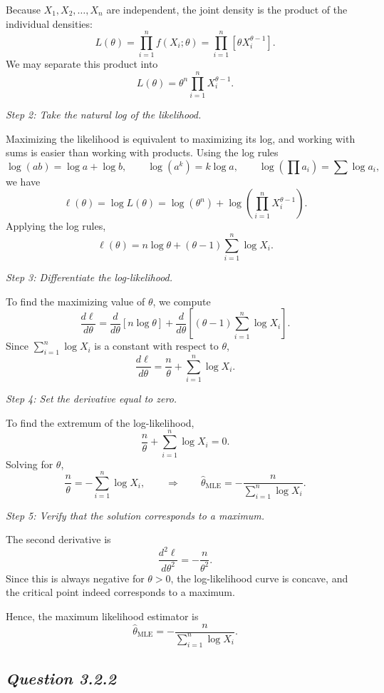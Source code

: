 \documentclass[11pt,letterpaper]{article}
\theoremstyle{remark}
\begin{document}
Because $X_1, X_2, \dots, X_n$ are independent, the joint density is the
product of the individual densities:
\[
L(\theta)
= \prod_{i=1}^n f(X_i;\theta)
= \prod_{i=1}^n \left[\theta X_i^{\theta-1}\right].
\]
We may separate this product into
\[
L(\theta)
= \theta^n \prod_{i=1}^n X_i^{\theta-1}.
\]

\textit{Step 2: Take the natural log of the likelihood.}

Maximizing the likelihood is equivalent to maximizing its log,
and working with sums is easier than working with products.
Using the log rules
\[
\log(a b) = \log a + \log b, \qquad
\log(a^k) = k \log a, \qquad
\log\left(\prod a_i\right) = \sum \log a_i,
\]
we have
\[
\ell(\theta)
= \log L(\theta)
= \log(\theta^n) + \log\left(\prod_{i=1}^n X_i^{\theta-1}\right).
\]
Applying the log rules,
\[
\ell(\theta)
= n\log\theta + (\theta - 1)\sum_{i=1}^n \log X_i.
\]

\textit{Step 3: Differentiate the log-likelihood.}

To find the maximizing value of $\theta$, we compute
\[
\frac{d\ell}{d\theta}
= \frac{d}{d\theta}\left[n\log\theta\right]
+ \frac{d}{d\theta}\left[(\theta-1)\sum_{i=1}^n \log X_i\right].
\]
Since $\sum_{i=1}^n \log X_i$ is a constant with respect to $\theta$,
\[
\frac{d\ell}{d\theta}
= \frac{n}{\theta} + \sum_{i=1}^n \log X_i.
\]

\textit{Step 4: Set the derivative equal to zero.}

To find the extremum of the log-likelihood,
\[
\frac{n}{\theta} + \sum_{i=1}^n \log X_i = 0.
\]
Solving for $\theta$,
\[
\frac{n}{\theta} = -\sum_{i=1}^n \log X_i,
\qquad\Longrightarrow\qquad
\hat{\theta}_{\mathrm{MLE}}
= -\frac{n}{\sum_{i=1}^n \log X_i}.
\]

\textit{Step 5: Verify that the solution corresponds to a maximum.}

The second derivative is
\[
\frac{d^2\ell}{d\theta^2}
= -\frac{n}{\theta^2}.
\]
Since this is always negative for $\theta>0$, the log-likelihood curve is concave,
and the critical point indeed corresponds to a maximum.

Hence, the maximum likelihood estimator is
\[
\boxed{\hat{\theta}_{\mathrm{MLE}} = -\frac{n}{\sum_{i=1}^n \log X_i}}.
\]

\newpage

\subsection*{\textit{Question 3.2.2}}
\end{document}
